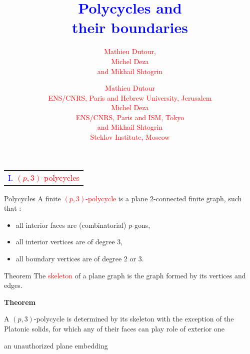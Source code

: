 \documentclass[%
pdf,
colorBG,
slideColor,
]{prosper}
\title{\Huge \textcolor{blue}{Polycycles and}\\[3mm]
\textcolor{blue}{their boundaries}}
\author{
\textcolor{red}{\Large Mathieu Dutour,}\\[2mm]
\textcolor{red}{\Large Michel Deza}\\[2mm]
\textcolor{red}{\Large and Mikhail Shtogrin}\\
}
\author{
\textcolor{red}{\Large Mathieu Dutour}\\[2mm]
\textcolor{red}{\large ENS/CNRS, Paris and Hebrew University, Jerusalem}\\[2mm]
\textcolor{red}{\Large Michel Deza}\\[2mm]
\textcolor{red}{\large ENS/CNRS, Paris and ISM, Tokyo}\\[2mm]
\textcolor{red}{\Large and Mikhail Shtogrin}\\[2mm]
\textcolor{red}{\large Steklov Institute, Moscow}
}
\date{}
\begin{document}
\maketitle




\begin{slide}{}
\begin{center}
{\Huge 
\begin{tabular*}{7cm}{c}
\\[-0.5cm]
\textcolor{blue}{I. }\textcolor{red}{$(p,3)$-polycycles}
\end{tabular*}
}
\end{center}
\end{slide}




\begin{slide}{Polycycles}
A finite \textcolor{red}{$(p,3)$-polycycle} is a plane $2$-connected finite graph, such that :
\begin{itemize}
\item all interior faces are (combinatorial) $p$-gons,
\item all interior vertices are of degree $3$,
\item all boundary vertices are of degree $2$ or $3$.
\end{itemize}

\begin{center}
\end{center}

\end{slide}


\begin{slide}{Theorem}
The \textcolor{red}{skeleton} of a plane graph is the graph formed by its vertices and edges.
{\it

{\bf Theorem}

A $(p,3)$-polycycle is determined by its skeleton
with the exception of the Platonic solids, for which any of their faces can
play role of exterior one

}

\begin{center}
\par
an unauthorized plane embedding
\end{center}


\end{slide}
\end{document}

